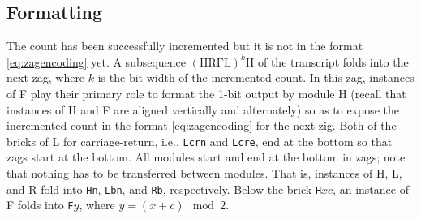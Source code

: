 \documentclass[twocolumn]{svjour3}
\begin{document}
\subsection{Formatting}
The count has been successfully incremented but it is not in the format \eqref{eq:zagencoding} yet.
A subsequence $(\mathrm{HRFL})^k \mathrm{H}$ of the transcript folds into the next zag, where $k$ is the bit width of the incremented count.
In this zag, instances of F play their primary role to format the 1-bit output by module H (recall that instances of H and F are aligned vertically and alternately) so as to expose the incremented count in the format \eqref{eq:zagencoding} for the next zig.
Both of the bricks of L for carriage-return, i.e., \texttt{Lcrn} and \texttt{Lcre}, end at the bottom so that zags start at the bottom.
All modules start and end at the bottom in zags; note that nothing has to be transferred between modules.
That is, instances of H, L, and R fold into \texttt{Hn}, \texttt{Lbn}, and \texttt{Rb}, respectively.
Below the brick \texttt{H}$xc$, an instance of F folds into \texttt{F}$y$, where $y = (x+c) \mod 2$.

%
\end{document}
